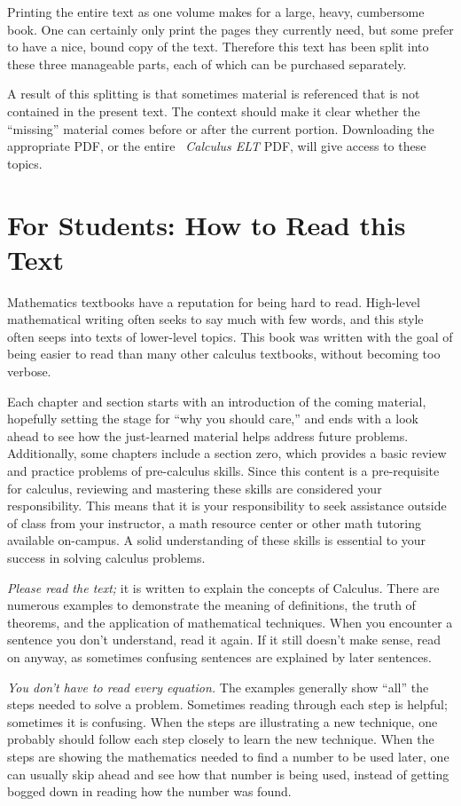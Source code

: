 Printing the entire text as one volume makes for a large, heavy, cumbersome book. One can certainly only print the pages they currently need, but some prefer to have a nice, bound copy of the text. Therefore this text has been split into these three manageable parts, each of which can be purchased separately.

A result of this splitting is that sometimes material is referenced that is not contained in the present text. The context should make it clear whether the ``missing'' material comes before or after the current portion. Downloading the appropriate PDF, or the entire \emph{\apex\ Calculus ELT} PDF, will give access to these topics.

\section*{For Students: How to Read this Text}

Mathematics textbooks have a reputation for being hard to read. High-level mathematical writing often seeks to say much with few words, and this style often seeps into texts of lower-level topics. This book was written with the goal of being easier to read than many other calculus textbooks, without becoming too verbose. 

Each chapter and section starts with an introduction of the coming material, hopefully setting the stage for ``why you should care,'' and ends with a look ahead to see how the just-learned material helps address future problems. Additionally, some chapters include a section zero, which provides a basic review and practice problems of pre-calculus skills. Since this content is a pre-requisite for calculus, reviewing and mastering these skills are considered your responsibility. This means that it is your responsibility to seek assistance outside of class from your instructor, a math resource center or other math tutoring available on-campus.  A solid understanding of these skills is essential to your success in solving calculus problems.

\emph{Please read the text;} it is written to explain the concepts of Calculus. There are numerous examples to demonstrate the meaning of definitions, the truth of theorems, and the application of mathematical techniques. When you encounter a sentence you don't understand, read it again. If it still doesn't make sense, read on anyway, as sometimes confusing sentences are explained by later sentences.

\emph{You don't have to read every equation.} The examples generally show ``all'' the steps needed to solve a problem. Sometimes reading through each step is helpful; sometimes it is confusing. When the steps are illustrating a new technique, one probably should follow each step closely to learn the new technique. When the steps are showing the mathematics needed to find a number to be used later, one can usually skip ahead and see how that number is being used, instead of getting bogged down in reading how the number was found.


